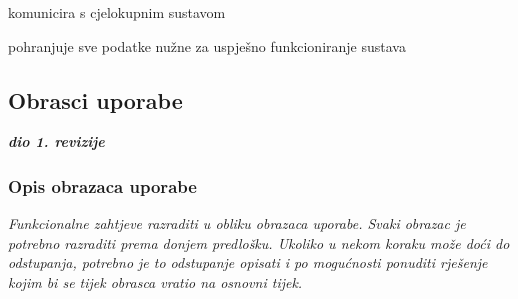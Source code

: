 \begin{packed_enum}
\begin{packed_enum}
				\end{packed_enum}
	
				\item  {}
				
					\begin{packed_enum}
						
						\item komunicira s cjelokupnim sustavom
						\item pohranjuje sve podatke nužne za uspješno funkcioniranje sustava
						
					\end{packed_enum}
			\end{packed_enum}
			
			\eject 
			
			
				
			\subsection{Obrasci uporabe}
				
				\textbf{\textit{dio 1. revizije}}
				
				\subsubsection{Opis obrazaca uporabe}
					\textit{Funkcionalne zahtjeve razraditi u obliku obrazaca uporabe. Svaki obrazac je potrebno razraditi prema donjem predlošku. Ukoliko u nekom koraku može doći do odstupanja, potrebno je to odstupanje opisati i po mogućnosti ponuditi rješenje kojim bi se tijek obrasca vratio na osnovni tijek.}\\
					

